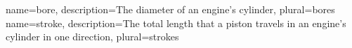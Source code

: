{
  name={bore},
  description={The diameter of an engine's cylinder},
  plural={bores}
}
{
  name={stroke},
  description={The total length that a piston travels in an engine's cylinder in one direction},
  plural={strokes}
}
